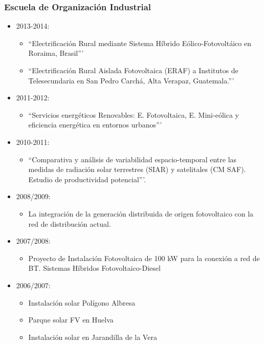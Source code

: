 \documentclass[article, a4paper]{memoir}
\begin{document}
\subsubsection{Escuela de Organización Industrial}
\label{sec-5-3-2}
\begin{itemize}
\item 2013-2014:
\begin{itemize}
\item ``Electrificación Rural mediante Sistema Híbrido Eólico-Fotovoltáico en Roraima, Brasil'''
\item ``Electrificación Rural Aislada Fotovoltaica (ERAF) a Institutos de Telesecundaria en San Pedro Carchá, Alta Verapaz, Guatemala.'''
\end{itemize}
\item 2011-2012:
\begin{itemize}
\item ``Servicios energéticos Renovables: E. Fotovoltaica, E. Mini-eólica y eficiencia energética en entornos urbanos'''
\end{itemize}
\item 2010-2011:
\begin{itemize}
\item ``Comparativa y análisis de variabilidad espacio-temporal entre las medidas de radiación solar terrestres (SIAR) y satelitales (CM SAF). Estudio de productividad potencial'''.
\end{itemize}
\item 2008/2009:
\begin{itemize}
\item \guillemotleft{}La integración de la generación distribuida de origen fotovoltaico con la red de distribución actual.
\end{itemize}
\item 2007/2008:
\begin{itemize}
\item \guillemotleft{}Proyecto de Instalación Fotovoltaica de 100 kW para la conexión a red de BT. Sistemas Híbridos Fotovoltaico-Diesel\guillemotright{}
\end{itemize}
\item 2006/2007:
\begin{itemize}
\item \guillemotleft{}Instalación solar Polígono Albresa\guillemotright{}
\item \guillemotleft{}Parque solar FV en Huelva\guillemotright{}
\item \guillemotleft{}Instalación solar en Jarandilla de la Vera\guillemotright{}

\end{itemize}
\end{itemize}
\end{document}
